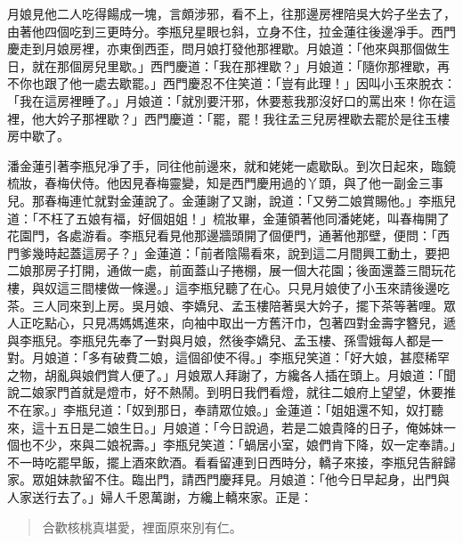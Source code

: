 月娘見他二人吃得餳成一塊，言頗涉邪，看不上，往那邊房裡陪吳大妗子坐去了，由著他四個吃到三更時分。李瓶兒星眼乜斜，立身不住，拉金蓮往後邊凈手。西門慶走到月娘房裡，亦東倒西歪，問月娘打發他那裡歇。月娘道：「他來與那個做生日，就在那個房兒里歇。」西門慶道：「我在那裡歇？」月娘道：「隨你那裡歇，再不你也跟了他一處去歇罷。」西門慶忍不住笑道：「豈有此理！」因叫小玉來脫衣：「我在這房裡睡了。」月娘道：「就別要汗邪，休要惹我那沒好口的罵出來！你在這裡，他大妗子那裡歇？」西門慶道：「罷，罷！我往孟三兒房裡歇去罷於是往玉樓房中歇了。

潘金蓮引著李瓶兒凈了手，同往他前邊來，就和姥姥一處歇臥。到次日起來，臨鏡梳妝，春梅伏侍。他因見春梅靈變，知是西門慶用過的丫頭，與了他一副金三事兒。那春梅連忙就對金蓮說了。金蓮謝了又謝，說道：「又勞二娘賞賜他。」李瓶兒道：「不枉了五娘有福，好個姐姐！」梳妝畢，金蓮領著他同潘姥姥，叫春梅開了花園門，各處游看。李瓶兒看見他那邊牆頭開了個便門，通著他那壁，便問：「西門爹幾時起蓋這房子？」金蓮道：「前者陰陽看來，說到這二月間興工動土，要把二娘那房子打開，通做一處，前面蓋山子捲棚，展一個大花園；後面還蓋三間玩花樓，與奴這三間樓做一條邊。」這李瓶兒聽了在心。只見月娘使了小玉來請後邊吃茶。三人同來到上房。吳月娘、李嬌兒、孟玉樓陪著吳大妗子，擺下茶等著哩。眾人正吃點心，只見馮媽媽進來，向袖中取出一方舊汗巾，包著四對金壽字簪兒，遞與李瓶兒。李瓶兒先奉了一對與月娘，然後李嬌兒、孟玉樓、孫雪娥每人都是一對。月娘道：「多有破費二娘，這個卻使不得。」李瓶兒笑道：「好大娘，甚麼稀罕之物，胡亂與娘們賞人便了。」月娘眾人拜謝了，方纔各人插在頭上。月娘道：「聞說二娘家門首就是燈市，好不熱鬧。到明日我們看燈，就往二娘府上望望，休要推不在家。」李瓶兒道：「奴到那日，奉請眾位娘。」金蓮道：「姐姐還不知，奴打聽來，這十五日是二娘生日。」月娘道：「今日說過，若是二娘貴降的日子，俺姊妹一個也不少，來與二娘祝壽。」李瓶兒笑道：「蝸居小室，娘們肯下降，奴一定奉請。」不一時吃罷早飯，擺上酒來飲酒。看看留連到日西時分，轎子來接，李瓶兒告辭歸家。眾姐妹款留不住。臨出門，請西門慶拜見。月娘道：「他今日早起身，出門與人家送行去了。」婦人千恩萬謝，方纔上轎來家。正是：
\begin{quote}
合歡核桃真堪愛，裡面原來別有仁。
\end{quote}
